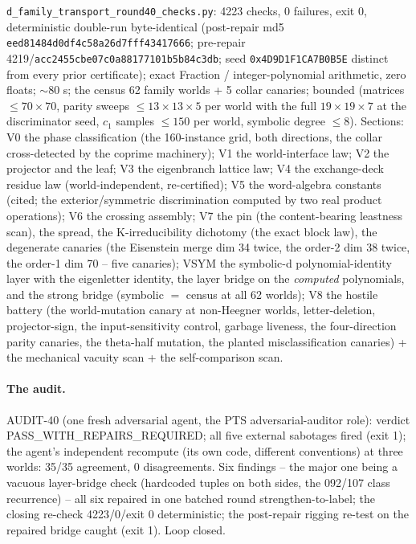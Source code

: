 \documentclass[11pt]{article}
\begin{document}
\texttt{d\_family\_transport\_round40\_checks.py}: 4223 checks, 0
failures, exit 0, deterministic double-run byte-identical (post-repair md5
\texttt{eed81484d0df4c58a26d7fff43417666}; pre-repair
4219/\texttt{acc2455cbe07c0a88177101b5b84c3db}; seed
\texttt{0x4D9D1F1CA7B0B5E} distinct from every prior certificate); exact
Fraction / integer-polynomial arithmetic, zero floats; $\sim$80 s; the
census 62 family worlds + 5 collar canaries; bounded (matrices
$\leq 70\times 70$, parity sweeps $\leq 13\times 13\times 5$ per world
with the full $19\times 19\times 7$ at the discriminator seed, $c_1$
samples $\leq 150$ per world, symbolic degree $\leq 8$). Sections: V0 the
phase classification (the 160-instance grid, both directions, the
collar cross-detected by the coprime machinery); V1 the world-interface
law; V2 the projector and the leaf; V3 the eigenbranch lattice law; V4
the exchange-deck residue law (world-independent, re-certified); V5 the
word-algebra constants (cited; the exterior/symmetric discrimination
computed by two real product operations); V6 the crossing assembly; V7
the pin (the content-bearing leastness scan), the spread, the
K-irreducibility dichotomy (the exact block law), the degenerate
canaries (the Eisenstein merge dim 34 twice, the order-2 dim 38 twice,
the order-1 dim 70 -- five canaries); VSYM the symbolic-d
polynomial-identity layer with the eigenletter identity, the layer
bridge on the \emph{computed} polynomials, and the strong bridge
(symbolic $=$ census at all 62 worlds); V8 the hostile battery (the
world-mutation canary at non-Heegner worlds, letter-deletion,
projector-sign, the input-sensitivity control, garbage liveness, the
four-direction parity canaries, the theta-half mutation, the planted
misclassification canaries) + the mechanical vacuity scan + the
self-comparison scan.

\paragraph{The audit.} AUDIT-40 (one fresh adversarial agent, the PTS
adversarial-auditor role): verdict PASS\_WITH\_REPAIRS\_REQUIRED; all
five external sabotages fired (exit 1); the agent's independent recompute
(its own code, different conventions) at three worlds: 35/35 agreement,
0 disagreements. Six findings -- the major one being a vacuous
layer-bridge check (hardcoded tuples on both sides, the 092/107 class
recurrence) -- all six repaired in one batched round strengthen-to-label;
the closing re-check 4223/0/exit 0 deterministic; the post-repair
rigging re-test on the repaired bridge caught (exit 1). Loop closed.
\end{document}

